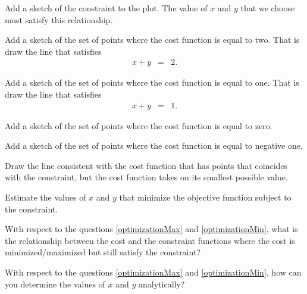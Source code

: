 \begin{problem}
  \begin{subproblem}
    \item Add a sketch of the constraint to the plot. The value of $x$
      and $y$ that we choose must satisfy this relationship.
    \item Add a sketch of the set of points where the cost function is
      equal to two. That is draw the line that satisfies
      \begin{eqnarray*}
        x + y & = & 2.
      \end{eqnarray*}
    \item Add a sketch of the set of points where the cost function is
      equal to one. That is draw the line that satisfies
      \begin{eqnarray*}
        x + y & = & 1.
      \end{eqnarray*}
    \item Add a sketch of the set of points where the cost function is
      equal to zero.
    \item Add a sketch of the set of points where the cost function is
      equal to negative one.
    \item Draw the line consistent with the cost function that
      has points that coincides with the constraint, but the cost
      function takes on its smallest possible value.
    \item Estimate the values of $x$ and $y$ that minimize the
      objective function subject to the constraint.
  \end{subproblem}

  \clearpage

\item With respect to the questions \ref{optimizationMax} and
  \ref{optimizationMin}, what is the relationship between the
  cost and the constraint functions where the cost is
  minimized/maximized but still satisfy the constraint?

  \vfill

\item With respect to the questions \ref{optimizationMax} and
  \ref{optimizationMin}, how can you determine the values of $x$ and
  $y$ analytically?

  \vfill
  \vfill


\end{problem}

\postClass

